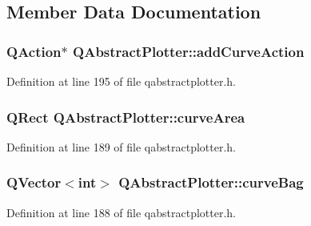 \subsection{Member Data Documentation}
\hypertarget{class_q_abstract_plotter_aead5ab3bfcc56d03d12577dd88806cb6}{}
\subsubsection[{add\+Curve\+Action}]{\setlength{\rightskip}{0pt plus 5cm}Q\+Action$\ast$ Q\+Abstract\+Plotter\+::add\+Curve\+Action\hspace{0.3cm}{\ttfamily [protected]}}\label{class_q_abstract_plotter_aead5ab3bfcc56d03d12577dd88806cb6}


Definition at line 195 of file qabstractplotter.\+h.

\hypertarget{class_q_abstract_plotter_a2698abe37c976f5c77c8e26693ff2ae5}{}
\subsubsection[{curve\+Area}]{\setlength{\rightskip}{0pt plus 5cm}Q\+Rect Q\+Abstract\+Plotter\+::curve\+Area\hspace{0.3cm}{\ttfamily [protected]}}\label{class_q_abstract_plotter_a2698abe37c976f5c77c8e26693ff2ae5}


Definition at line 189 of file qabstractplotter.\+h.

\hypertarget{class_q_abstract_plotter_a1b5881e413b257f306964f59415113c3}{}
\subsubsection[{curve\+Bag}]{\setlength{\rightskip}{0pt plus 5cm}Q\+Vector$<$int$>$ Q\+Abstract\+Plotter\+::curve\+Bag\hspace{0.3cm}{\ttfamily [protected]}}\label{class_q_abstract_plotter_a1b5881e413b257f306964f59415113c3}


Definition at line 188 of file qabstractplotter.\+h.

\hypertarget{class_q_abstract_plotter_a4d4f8fc4f2672d09cab0271a02968d59}{}
